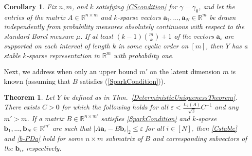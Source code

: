 \documentclass[journal, twocolumn]{IEEEtran}
\newtheorem{theorem}{Theorem}
\newtheorem{corollary}{Corollary}
\begin{document}

\begin{corollary}\label{ProbabilisticCor}
Fix $n, m$, and $k$ satisfying \eqref{CScondition} for $\gamma = \gamma_0$, and let the entries of the matrix $A \in \mathbb{R}^{n \times m}$ and $k$-sparse vectors $\mathbf{a}_1, \ldots, \mathbf{a}_N \in \mathbb{R}^m$ be drawn independently from probability measures absolutely continuous with respect to the standard Borel measure $\mu$. If at least $(k-1){m \choose k} + 1$ of the vectors $\mathbf{a}_i$ are supported on each interval of length $k$ in some cyclic order on $[m]$, then $Y$ has a stable $k$-sparse representation in $\mathbb{R}^m$ with probability one.
\end{corollary}



Next, we address when only an upper bound $m'$ on the latent dimension $m$ is known (assuming that $B$ satisfies (\ref{SparkCondition})). 

\begin{theorem}\label{DeterministicUniquenessTheorem2}
Let $Y$ be defined as in Thm.~\ref{DeterministicUniquenessTheorem}. There exists $C > 0$ for which the following holds for all $\varepsilon < \frac{L_2(A)}{\sqrt{2}}C^{-1}$ and any $m' > m$. If a matrix $B \in \mathbb{R}^{n \times m'}$ satisfies \eqref{SparkCondition} and $k$-sparse $\mathbf{b}_1, \ldots, \mathbf{b}_N \in \mathbb{R}^{m'}$ are such that \mbox{$|A\mathbf{a}_i - B\mathbf{b}_i|_2 \leq \varepsilon$} for all $i \in [N]$, then \eqref{Cstable} and \eqref{b-PDa} hold for some $n \times m$ submatrix of $B$ and corresponding subvectors of the $\mathbf{b}_i$, respectively. 
\end{theorem}
\end{document}
